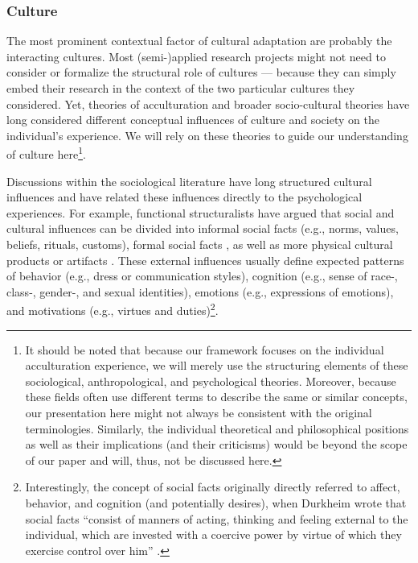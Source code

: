 \documentclass[man, 12pt, a4paper]{apa7}
\begin{document}
\subsubsection{Culture} 
The most prominent contextual factor of cultural adaptation are probably the interacting cultures. 
Most (semi-)applied research projects might not need to consider or formalize the structural role of cultures --- because they can simply embed their research in the context of the two particular cultures they considered.
Yet, theories of acculturation and broader socio-cultural theories have long considered different conceptual influences of culture and society on the individual's experience. We will rely on these theories to guide our understanding of culture here\footnote{It should be noted that because our framework focuses on the individual acculturation experience, we will merely use the structuring elements of these sociological, anthropological, and psychological theories. Moreover, because these fields often use different terms to describe the same or similar concepts, our presentation here might not always be consistent with the original terminologies. Similarly, the individual theoretical and philosophical positions as well as their implications (and their criticisms) would be beyond the scope of our paper and will, thus, not be discussed here.}.

Discussions within the sociological literature have long structured cultural influences and have related these influences directly to the psychological experiences. For example, functional structuralists have argued that social and cultural influences can be divided into informal social facts (e.g., norms, values, beliefs, rituals, customs), formal social facts \citep[e.g., laws, regulations, policies, history, language; also see][]{Herzog2018, Gilbert1989}, as well as more physical cultural products or artifacts \citep[e.g., food, fashion, architecture, or arts, such as film, music, literature, and fine arts; e.g., see][]{Alexander2001}. These external influences usually define expected patterns of behavior (e.g., dress or communication styles), cognition (e.g., sense of race-, class-, gender-, and sexual identities), emotions (e.g., expressions of emotions), and motivations (e.g., virtues and duties)\footnote{Interestingly, the concept of social facts originally directly referred to affect, behavior, and cognition (and potentially desires), when Durkheim wrote that social facts ``consist of manners of acting, thinking and feeling external to the individual, which are invested with a coercive power by virtue of which they exercise control over him'' \citep[][p. 52]{Durkheim1982}.}.
\end{document}
